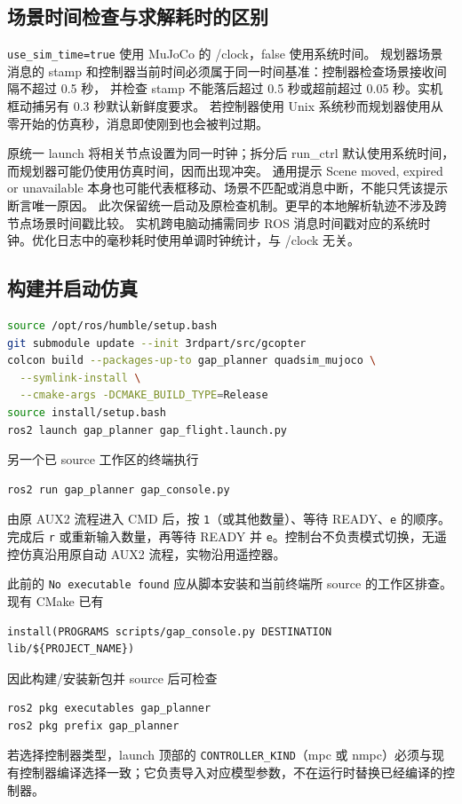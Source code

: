 \documentclass[UTF8,fontset=fandol,a4paper,10pt]{ctexart}
\newcommand{\code}[1]{{\small\nolinkurl{#1}}}
\begin{document}
\subsection{场景时间检查与求解耗时的区别}
\code{use_sim_time=true} 使用 MuJoCo 的 /clock，false 使用系统时间。
规划器场景消息的 stamp 和控制器当前时间必须属于同一时间基准：控制器检查场景接收间隔不超过 0.5 秒，
并检查 stamp 不能落后超过 0.5 秒或超前超过 0.05 秒。实机框动捕另有 0.3 秒默认新鲜度要求。
若控制器使用 Unix 系统秒而规划器使用从零开始的仿真秒，消息即使刚到也会被判过期。

原统一 launch 将相关节点设置为同一时钟；拆分后 run\_ctrl 默认使用系统时间，而规划器可能仍使用仿真时间，因而出现冲突。
通用提示 Scene moved, expired or unavailable 本身也可能代表框移动、场景不匹配或消息中断，不能只凭该提示断言唯一原因。
此次保留统一启动及原检查机制。更早的本地解析轨迹不涉及跨节点场景时间戳比较。
实机跨电脑动捕需同步 ROS 消息时间戳对应的系统时钟。优化日志中的毫秒耗时使用单调时钟统计，与 /clock 无关。

\subsection{构建并启动仿真}
\begin{lstlisting}[language=bash]
source /opt/ros/humble/setup.bash
git submodule update --init 3rdpart/src/gcopter
colcon build --packages-up-to gap_planner quadsim_mujoco \
  --symlink-install \
  --cmake-args -DCMAKE_BUILD_TYPE=Release
source install/setup.bash
ros2 launch gap_planner gap_flight.launch.py
\end{lstlisting}
另一个已 source 工作区的终端执行
\begin{lstlisting}[language=bash]
ros2 run gap_planner gap_console.py
\end{lstlisting}
由原 AUX2 流程进入 CMD 后，按 \code{1}（或其他数量）、等待 READY、\code{e} 的顺序。完成后 \code{r} 或重新输入数量，再等待 READY 并 \code{e}。控制台不负责模式切换，无遥控仿真沿用原自动 AUX2 流程，实物沿用遥控器。

此前的 \code{No executable found} 应从脚本安装和当前终端所 source 的工作区排查。现有 CMake 已有
\begin{lstlisting}
install(PROGRAMS scripts/gap_console.py DESTINATION lib/${PROJECT_NAME})
\end{lstlisting}
因此构建/安装新包并 source 后可检查
\begin{lstlisting}[language=bash]
ros2 pkg executables gap_planner
ros2 pkg prefix gap_planner
\end{lstlisting}
若选择控制器类型，launch 顶部的 \code{CONTROLLER_KIND}（mpc 或 nmpc）必须与现有控制器编译选择一致；它负责导入对应模型参数，不在运行时替换已经编译的控制器。
\end{document}
